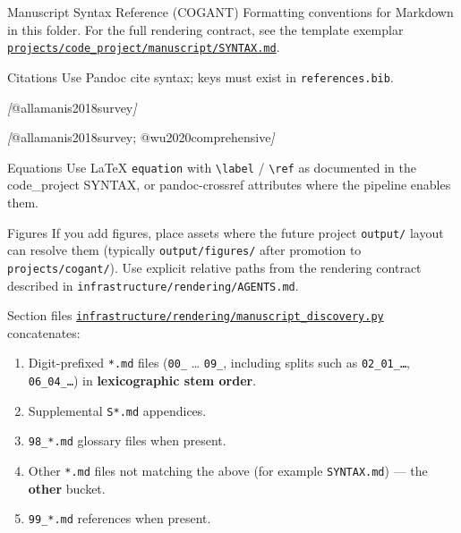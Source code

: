 \documentclass[
  ignorenonframetext,
]{beamer}
\author{\texorpdfstring{}{}}
\date{}
\newenvironment{Shaded}{}{}
\newcommand{\CommentTok}[1]{\textcolor[rgb]{0.38,0.63,0.69}{\textit{#1}}}
\newcommand{\OtherTok}[1]{\textcolor[rgb]{0.00,0.44,0.13}{#1}}
\providecommand{\tightlist}{%
  \setlength{\itemsep}{0pt}\setlength{\parskip}{0pt}}
\begin{document}
\begin{frame}[fragile]{Manuscript Syntax Reference (COGANT)}
\protect{}\label{manuscript-syntax-reference-cogant}
Formatting conventions for Markdown in this folder. For the full
rendering contract, see the template exemplar
\href{../../../projects/code_project/manuscript/SYNTAX.md}{\texttt{projects/code\_project/manuscript/SYNTAX.md}}.

\begin{block}{Citations}
\protect{}\label{citations}
Use Pandoc cite syntax; keys must exist in \texttt{references.bib}.

\begin{Shaded}
\begin{Highlighting}[]
\CommentTok{[}\OtherTok{@allamanis2018survey}\CommentTok{]}

\CommentTok{[}\OtherTok{@allamanis2018survey; @wu2020comprehensive}\CommentTok{]}
\end{Highlighting}
\end{Shaded}
\end{block}

\begin{block}{Equations}
\protect{}\label{equations}
Use LaTeX \texttt{equation} with \texttt{\textbackslash{}label} /
\texttt{\textbackslash{}ref} as documented in the code\_project SYNTAX,
or pandoc-crossref attributes where the pipeline enables them.
\end{block}

\begin{block}{Figures}
\protect{}\label{figures}
If you add figures, place assets where the future project
\texttt{output/} layout can resolve them (typically
\texttt{output/figures/} after promotion to \texttt{projects/cogant/}).
Use explicit relative paths from the rendering contract described in
\texttt{infrastructure/rendering/AGENTS.md}.
\end{block}

\begin{block}{Section files}
\protect{}\label{section-files}
\href{../../../infrastructure/rendering/manuscript_discovery.py}{\texttt{infrastructure/rendering/manuscript\_discovery.py}}
concatenates:

\begin{enumerate}
\tightlist
\item
  Digit-prefixed \texttt{*.md} files (\texttt{00\_} \ldots{}
  \texttt{09\_}, including splits such as \texttt{02\_01\_…},
  \texttt{06\_04\_…}) in \textbf{lexicographic stem order}.
\item
  Supplemental \texttt{S*.md} appendices.
\item
  \texttt{98\_*.md} glossary files when present.
\item
  Other \texttt{*.md} files not matching the above (for example
  \texttt{SYNTAX.md}) --- the \textbf{other} bucket.
\item
  \texttt{99\_*.md} references when present.
\end{enumerate}


\end{block}
\end{frame}
\end{document}
